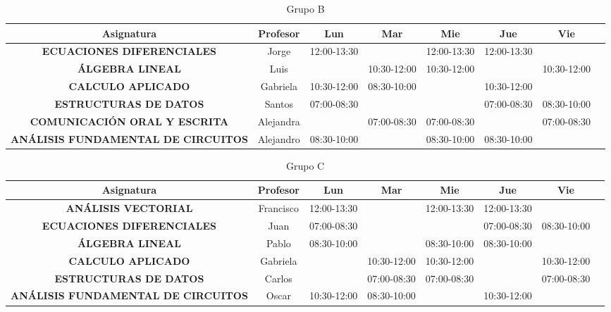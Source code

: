 \documentclass[10pt,letterpaper,twoside,openright]{article}
\begin{document}
	\begin{table}[h!]
		\centering
		\begin{adjustbox}{max width=\textwidth}
		\begin{tabular}{c||ccccccc}
		\textbf{Asignatura}                        & \textbf{Profesor} & \textbf{Lun} & \textbf{Mar} & \textbf{Mie} & \textbf{Jue} & \textbf{Vie} \\ \hline \hline
		\textbf{ECUACIONES DIFERENCIALES}          & Jorge             & 12:00-13:30  &              & 12:00-13:30  & 12:00-13:30  &              \\
		\textbf{ÁLGEBRA LINEAL}                    & Luis              &              & 10:30-12:00  & 10:30-12:00  &              & 10:30-12:00  \\
		\textbf{CALCULO APLICADO}                  & Gabriela          & 10:30-12:00  & 08:30-10:00  &              & 10:30-12:00  &              \\
		\textbf{ESTRUCTURAS DE DATOS}              & Santos            & 07:00-08:30  &              &              & 07:00-08:30  & 08:30-10:00  \\
		\textbf{COMUNICACIÓN ORAL Y ESCRITA}       & Alejandra         &              & 07:00-08:30  & 07:00-08:30  &              & 07:00-08:30  \\
		\textbf{ANÁLISIS FUNDAMENTAL DE CIRCUITOS} & Alejandro         & 08:30-10:00  &              & 08:30-10:00  & 08:30-10:00  &
		\end{tabular}
		\end{adjustbox}
		\caption{Grupo B}
		\label{tab:grupo_b}
	\end{table}

	\begin{table}[h!]
		\centering
		\begin{adjustbox}{max width=\textwidth}
		\begin{tabular}{c||ccccccc}
		\textbf{Asignatura}                        & \textbf{Profesor} & \textbf{Lun} & \textbf{Mar} & \textbf{Mie} & \textbf{Jue} & \textbf{Vie} \\ \hline \hline
		\textbf{ANÁLISIS VECTORIAL}                & Francisco & 12:00-13:30 &             & 12:00-13:30 & 12:00-13:30 &             \\
		\textbf{ECUACIONES DIFERENCIALES}          & Juan      & 07:00-08:30 &             &             & 07:00-08:30 & 08:30-10:00 \\
		\textbf{ÁLGEBRA LINEAL}                    & Pablo     & 08:30-10:00 &             & 08:30-10:00 & 08:30-10:00 &             \\
		\textbf{CALCULO APLICADO}                  & Gabriela  &             & 10:30-12:00 & 10:30-12:00 &             & 10:30-12:00 \\
		\textbf{ESTRUCTURAS DE DATOS}              & Carlos    &             & 07:00-08:30 & 07:00-08:30 &             & 07:00-08:30 \\
		\textbf{ANÁLISIS FUNDAMENTAL DE CIRCUITOS} & Oscar     & 10:30-12:00 & 08:30-10:00 &             & 10:30-12:00 &
		\end{tabular}
		\end{adjustbox}
		\caption{Grupo C}
		\label{tab:grupo_c}
	\end{table}
\end{document}
